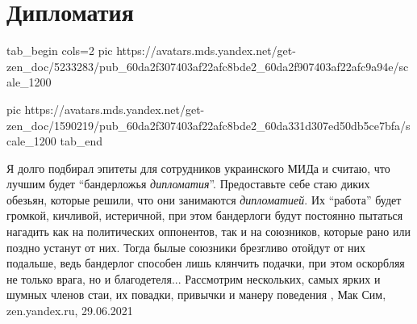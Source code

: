  
 
 
 
 
\chapter{Дипломатия}

\ifcmt

\ifcmt
  tab_begin cols=2
    pic https://avatars.mds.yandex.net/get-zen_doc/5233283/pub_60da2f307403af22afc8bde2_60da2f907403af22afc9a94e/scale_1200

    pic https://avatars.mds.yandex.net/get-zen_doc/1590219/pub_60da2f307403af22afc8bde2_60da331d307ed50db5ce7bfa/scale_1200
  tab_end
\fi

\fi
Я долго подбирал эпитеты для сотрудников украинского МИДа и считаю, что лучшим
будет \enquote{бандерложья \emph{дипломатия}}.  Предоставьте себе стаю диких обезьян, которые
решили, что они занимаются \emph{дипломатией}. Их \enquote{работа} будет громкой, кичливой,
истеричной, при этом бандерлоги будут постоянно пытаться нагадить как на
политических оппонентов, так и на союзников, которые рано или поздно устанут от
них. Тогда былые союзники брезгливо отойдут от них подальше, ведь бандерлог
способен лишь клянчить подачки, при этом оскорбляя не только врага, но и
благодетеля...  Рассмотрим нескольких, самых ярких и шумных членов стаи, их
повадки, привычки и манеру поведения
, 
Мак Сим, zen.yandex.ru, 29.06.2021
